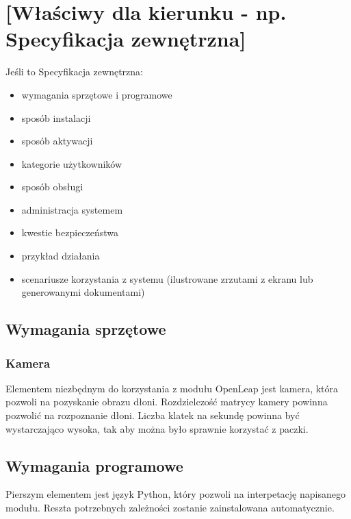 

\chapter{[Właściwy dla kierunku - np. Specyfikacja zewnętrzna]}
Jeśli to Specyfikacja zewnętrzna:
\begin{itemize}
\item  wymagania sprzętowe i programowe
\item  sposób instalacji
\item  sposób aktywacji
\item  kategorie użytkowników
\item  sposób obsługi
\item   administracja systemem
\item  kwestie bezpieczeństwa
\item  przykład działania
\item  scenariusze korzystania z systemu (ilustrowane zrzutami z ekranu lub generowanymi dokumentami)
\end{itemize}

\section{Wymagania sprzętowe}
\subsection{Kamera}
\quad Elementem niezbędnym do korzystania z modułu OpenLeap jest kamera, która pozwoli na pozyskanie obrazu dłoni. Rozdzielczość matrycy kamery powinna pozwolić na rozpoznanie dłoni. Liczba klatek na sekundę powinna być wystarczająco wysoka, tak aby można było sprawnie korzystać z paczki. 

\section{Wymagania programowe}
\quad Pierszym elementem jest język Python, który pozwoli na interpetację napisanego modułu. Reszta potrzebnych zależności zostanie zainstalowana automatycznie. 


